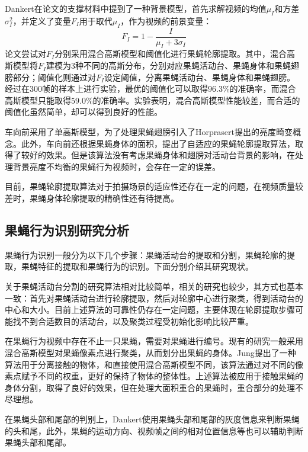 Dankert在论文的支撑材料中提到了一种背景模型\cite{dankert2009automated}，首先求解视频的均值$\mu_I$和方差$\sigma_I^2$，并定义了变量$F_I$用于取代$\mu_I$，作为视频的前景变量：
$$
F_I = 1 - \frac{I}{\mu_I + 3\sigma_I}
$$
论文尝试对$F_I$分别采用混合高斯模型和阈值化进行果蝇轮廓提取\cite{bilmes1998gentle}。其中，混合高斯模型将$F_I$建模为3种不同的高斯分布，分别对应果蝇活动台、果蝇身体和果蝇翅膀部分；阈值化则通过对$F_I$设定阈值，分离果蝇活动台、果蝇身体和果蝇翅膀。经过在300帧的样本上进行实验，最优的阈值化可以取得$96.3\%$的准确率，而混合高斯模型只能取得$59.0\%$的准确率。实验表明，混合高斯模型性能较差，而合适的阈值化虽然简单，却可以得到良好的性能。

车向前采用了单高斯模型\cite{chexiangqian}，为了处理果蝇翅膀引入了Horprasert提出的亮度畸变概念\cite{shadow_2000}。此外，车向前还根据果蝇身体的面积，提出了自适应的果蝇轮廓提取算法，取得了较好的效果。但是该算法没有考虑果蝇身体和翅膀对活动台背景的影响，在处理背景亮度不均衡的果蝇行为视频时，会存在一定的误差。

目前，果蝇轮廓提取算法对于拍摄场景的适应性还存在一定的问题，在视频质量较差时，果蝇身体轮廓提取的精确性还有待提高。

\subsection{果蝇行为识别研究分析}

果蝇行为识别一般分为以下几个步骤：果蝇活动台的提取和分割，果蝇轮廓的提取，果蝇特征的提取和果蝇行为的识别。下面分别介绍其研究现状。

关于果蝇活动台分割的研究算法相对比较简单，相关的研究也较少\cite{chexiangqian,dankert2009automated}，其方式也基本一致：首先对果蝇活动台进行轮廓提取，然后对轮廓中心进行聚类，得到活动台的中心和大小。目前上述算法的可靠性仍存在一定问题，主要体现在轮廓提取步骤可能找不到合适数目的活动台，以及聚类过程受初始化影响比较严重。

在果蝇行为视频中存在不止一只果蝇，需要对果蝇进行编号。现有的研究一般采用混合高斯模型对果蝇像素点进行聚类，从而划分出果蝇的身体\cite{highThroughput_2009}。Jung提出了一种算法用于分离接触的物体\cite{cell_seg_2010}，和直接使用混合高斯模型不同，该算法通过对不同的像素点赋予不同的权重，更好的保持了物体的整体性。上述算法被应用于接触果蝇的身体分割\cite{chexiangqian}，取得了良好的效果，但在处理大面积重合的果蝇时，重合部分的处理不尽理想。

在果蝇头部和尾部的判别上，Dankert使用果蝇头部和尾部的灰度信息来判断果蝇的头和尾\cite{dankert2009automated}，此外，果蝇的运动方向、视频帧之间的相对位置信息等也可以辅助判断果蝇头部和尾部。



